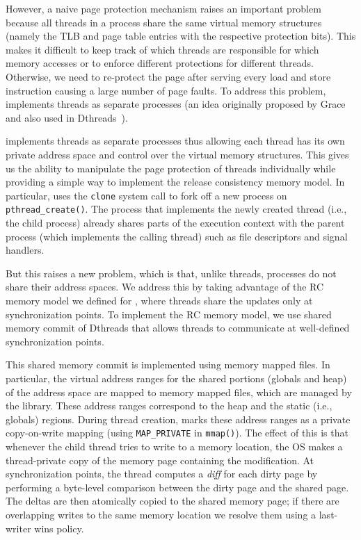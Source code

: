 However, a naive page protection mechanism raises an important problem because all threads in a process share the same virtual memory
structures (namely the TLB and page table entries with the respective protection bits). This makes it difficult to keep track of which
threads are responsible for which memory accesses or to enforce different protections for different threads. Otherwise, we need to re-protect the page after serving every load and store instruction causing a large number of page faults.
To address this problem, \projecttitle implements threads as separate
processes (an idea originally proposed by Grace~\cite{grace-oopsla-2009} and also used in Dthreads~\cite{dthreads-sosp-2011}).

 \projecttitle  implements threads as separate processes thus allowing each thread has its own private address space and control over the virtual
memory structures.   This gives us the ability to manipulate the page protection of threads individually while providing a simple way to implement the release consistency memory
model. In particular, \projecttitle uses the {\tt clone} system call to fork off a new process on {\tt pthread\_create()}. The process that implements the newly created thread (i.e., the child process) already
shares parts of the execution context with the parent process (which implements the calling thread) such as file descriptors and signal handlers. 


But this raises a new problem, which is that, unlike threads, processes do not share their address spaces. We address this by taking advantage of the RC memory model we defined for \projecttitle, where threads share the updates only at synchronization points.  To implement the RC memory model, we use shared memory commit of Dthreads that allows threads to communicate at well-defined synchronization points.


 This shared memory commit is implemented using memory mapped files. In
particular, the virtual address ranges for the shared portions (globals and heap) of
the address space are mapped to memory mapped files, which are managed by the
\projecttitle library. These address ranges correspond to the heap and
the static (i.e., globals) regions.  During thread creation,
\projecttitle marks these address ranges as a private copy-on-write
mapping (using {\tt MAP\_PRIVATE} in {\tt mmap()}). The effect of this
is that whenever the child thread tries to write to a memory location,
the OS makes a thread-private copy of the memory page containing the
modification.  At synchronization points, the thread computes a {\em diff}
for each dirty page by performing a byte-level comparison between the
dirty page and the shared page. The deltas are then atomically
copied to the shared memory page; if there are overlapping writes
to the same memory location we resolve them using a last-writer wins policy.
